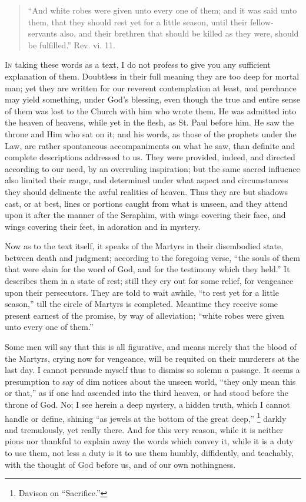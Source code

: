 
\begin{quote}

``And white robes were given unto every one of them; and it
was said unto them, that they should rest yet for a little season,
until their fellow-servants also, and their brethren that should be
killed as they were, should be fulfilled.'' Rev. vi. 11.

\end{quote}

I\textsc{n} taking these words as a text, I do not profess to give you any
sufficient explanation of them. Doubtless in their full meaning they
are too deep for mortal man; yet they are written for our reverent
contemplation at least, and perchance may yield something, under God's
blessing, even though the true and entire sense of them was lost to
the Church with him who wrote them. He was admitted into the heaven of
heavens, while yet in the flesh, as St. Paul before him. He saw the
throne and Him who sat on it; and his words, as those of the prophets
under the Law, are rather spontaneous accompaniments on what he saw,
than definite and complete descriptions addressed to us. They were
provided, indeed, and directed according to our need, by an overruling
inspiration; but the same sacred influence also limited their range,
and determined under what aspect and circumstances they should
delineate the awful realities of heaven. Thus they are but shadows
cast, or at best, lines or portions caught from what is unseen, and
they attend upon it after the manner of the Seraphim, with wings
covering their face, and wings covering their feet, in adoration and
in mystery.

Now as to the text itself, it speaks of the Martyrs in their
disembodied state, between death and judgment; according to the
foregoing verse, ``the souls of them that were slain for the word
of God, and for the testimony which they held.'' It describes them
in a state of rest; still they cry out for some relief, for vengeance
upon their persecutors. They are told to wait awhile, ``to rest
yet for a little season,'' till the circle of Martyrs is
completed. Meantime they receive some present earnest of the promise,
by way of alleviation; ``white robes were given unto every one of
them.''

Some men will say that this is all figurative, and means merely
that the blood of the Martyrs, crying now for vengeance, will be
requited on their murderers at the last day. I cannot persuade myself
thus to dismiss so solemn a passage. It seems a presumption to say of
dim notices about the unseen world, ``they only mean this or
that,'' as if one had ascended into the third heaven, or had stood
before the throne of God. No; I see herein a deep mystery, a hidden
truth, which I cannot handle or define, shining ``as jewels at the
bottom of the great deep,'' \footnote{Davison on ``Sacrifice.''} darkly and tremulously, yet really there. And for this very
reason, while it is neither pious nor thankful to explain away the
words which convey it, while it is a duty to use them, not less a duty
is it to use them humbly, diffidently, and teachably, with the thought
of God before us, and of our own nothingness.

